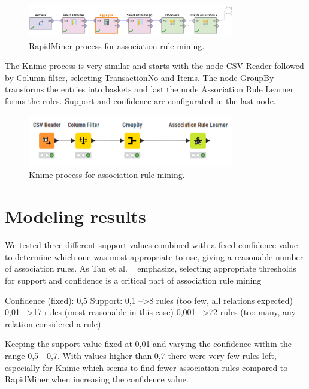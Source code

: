\begin{figure}[H]
\centering
\includegraphics[width=0.8\textwidth]{Figures/AssociationRulesRapidMinerProcess.png}
\caption{RapidMiner process for association rule mining.}
\label{fig:AssociationRulesRapidMinerProcess}
\end{figure}

The Knime process is very similar and starts with the node CSV-Reader followed by Column filter,
selecting TransactionNo and Items. The node GroupBy transforms the entries into baskets and last
the node Association Rule Learner forms the rules. Support and confidence are configurated in the
last node.

\begin{figure}[H]
\centering
\includegraphics[width=0.8\textwidth]{Figures/AssociationRulesKnimeProcess.png}
\caption{Knime process for association rule mining.}
\label{fig:KnimeProcess}
\end{figure}

\section{Modeling results}
We tested three different support values combined with a fixed confidence value to determine which
one was most appropriate to use, giving a reasonable number of association rules. As Tan et 
al. ~\cite[Ch.~5, Sec.~5.3]{courseLitt} emphasize, selecting appropriate thresholds for support and confidence 
is a critical part of association rule mining

Confidence (fixed): 0,5
Support:
0,1 --\textgreater 8 rules (too few, all relations expected)
0,01 --\textgreater 17 rules (most reasonable in this case)
0,001 --\textgreater 72 rules (too many, any relation considered a rule)

Keeping the support value fixed at 0,01 and varying the confidence within the range 0,5 - 0,7.
With values higher than 0,7 there were very few rules left, especially for Knime which seems to
find fewer association rules compared to RapidMiner when increasing the confidence value.


